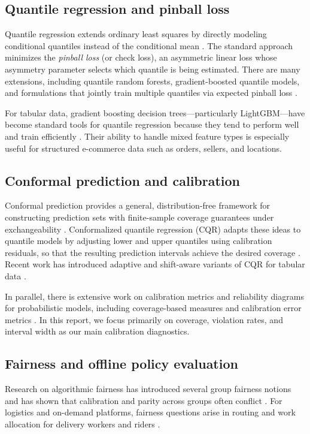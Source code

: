 \documentclass[10pt,twocolumn]{article}
\begin{document}
\subsection{Quantile regression and pinball loss}
Quantile regression extends ordinary least squares by directly modeling conditional quantiles instead of the conditional mean \citep{koenker1978,koenker2001}. The standard approach minimizes the \emph{pinball loss} (or check loss), an asymmetric linear loss whose asymmetry parameter selects which quantile is being estimated. There are many extensions, including quantile random forests, gradient-boosted quantile models, and formulations that jointly train multiple quantiles via expected pinball loss \citep{biau2024pinball,tagasovska2019epinball}.

For tabular data, gradient boosting decision trees---particularly LightGBM---have become standard tools for quantile regression because they tend to perform well and train efficiently \citep{lightgbm2017}. Their ability to handle mixed feature types is especially useful for structured e-commerce data such as orders, sellers, and locations.

\subsection{Conformal prediction and calibration}
Conformal prediction provides a general, distribution-free framework for constructing prediction sets with finite-sample coverage guarantees under exchangeability \citep{vovk2005algorithmic,angelopoulos2021gentle}. Conformalized quantile regression (CQR) adapts these ideas to quantile models by adjusting lower and upper quantiles using calibration residuals, so that the resulting prediction intervals achieve the desired coverage \citep{romano2019conformalized}. Recent work has introduced adaptive and shift-aware variants of CQR for tabular data \citep{sousa2024adaptive,zhang2023calibration}.

In parallel, there is extensive work on calibration metrics and reliability diagrams for probabilistic models, including coverage-based measures and calibration error metrics \citep{guo2017calibration,levi2022uncertainty}. In this report, we focus primarily on coverage, violation rates, and interval width as our main calibration diagnostics.

\subsection{Fairness and offline policy evaluation}
Research on algorithmic fairness has introduced several group fairness notions and has shown that calibration and parity across groups often conflict \citep{barocas2019fairness,pleiss2017fairness,kleinberg2017impossibility}. For logistics and on-demand platforms, fairness questions arise in routing and work allocation for delivery workers and riders \citep{gupta2022fairfoody,martinez2024fairrouting}.
\end{document}
